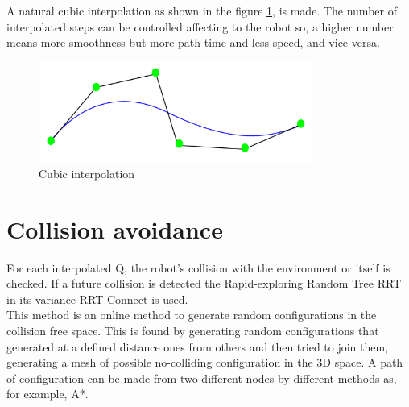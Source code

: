 A natural cubic interpolation as shown in the figure \ref{fig:cubic interpolation}, is made. The number of interpolated steps can be controlled affecting to the robot so, a higher number means more smoothness but more path time and less speed, and vice versa.

\begin{figure}[!hb]
	\centering
	\includegraphics[width=0.8\textwidth]{figures/cubic_interpolation}
	\caption{Cubic interpolation}
	\label{fig:cubic interpolation}
\end{figure}

\section{Collision avoidance} %
\label{sec:collision_avoidance}
For each interpolated Q, the robot's collision with the environment or itself is checked. If a future collision is detected the Rapid-exploring Random Tree RRT in its variance RRT-Connect \cite{RRTConnect} is used.\\

This method is an online method to generate random configurations in the collision free space. This is found by generating random configurations that generated at a defined distance ones from others and then tried to join them, generating a mesh of possible no-colliding configuration in the 3D space. A path of configuration can be made from two different nodes by different methods as, for example, A*.

